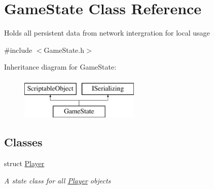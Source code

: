 \hypertarget{class_game_state}{\section{Game\-State Class Reference}
\label{class_game_state}
}


Holds all persistent data from network intergration for local usage  




{\ttfamily \#include $<$Game\-State.\-h$>$}

Inheritance diagram for Game\-State\-:\begin{figure}[H]
\begin{center}
\leavevmode
\includegraphics[height=2.000000cm]{class_game_state}
\end{center}
\end{figure}
\subsection*{Classes}
\begin{DoxyCompactItemize}
\item 
struct \hyperlink{class_game_state_1_1_player}{Player}
\begin{DoxyCompactList}\small\item\em A state class for all \hyperlink{class_game_state_1_1_player}{Player} objects \end{DoxyCompactList}\end{DoxyCompactItemize}
